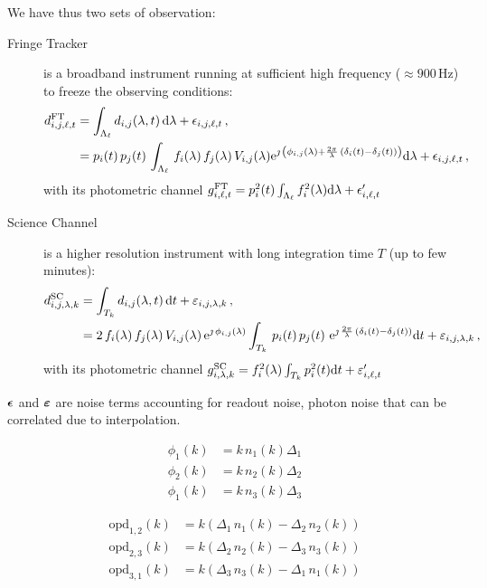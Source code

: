 \documentclass[a4paper,11pt,twoside]{scrartcl}
\newcommand{\FT}{\textrm{FT}} %
\newcommand{\SC}{\textrm{SC}} %
\newcommand{\opd}{\textrm{opd}}
\begin{document}
We have thus two sets of observation:
\begin{description}
	\item[Fringe Tracker] is a broadband instrument running at sufficient high frequency ($\approx 900\,$Hz) to freeze the observing conditions:
	\begin{align}
		d^\FT_{i,j,\ell,t} & =  \int_{\Lambda_\ell} d_{i,j}(\lambda,t)\, \D{\lambda} + \epsilon_{i,j,\ell,t}\,,\\
		& =  p_{i}(t)\,p_{j}(t)\, \int_{\Lambda_\ell} \,f_{i}(\lambda)\,f_{j}(\lambda) \, V_{i,j}(\lambda) 
			 \E^{\jmath \, \left(\phi_{i,j}(\lambda) + \frac{2\pi}{\lambda}\, (\delta_{i}(t) - \delta_{j}(t))\right)} \D{\lambda} + \epsilon_{i,j,\ell,t}\,,
	\end{align}
	with its photometric channel $ g^\FT_{i,\ell,t} = p_i^2(t)\int_{\Lambda_\ell} f^2_{i}(\lambda) \D{\lambda} + \epsilon'_{i,\ell,t}$
	\item[Science Channel] is a higher resolution instrument with long integration time $T$ (up to few minutes):
	\begin{align}
		d^\SC_{i,j,\lambda,k} & =  \int_{T_k} d_{i,j}(\lambda,t)\, \D{t} + \varepsilon_{i,j,\lambda,k}\,,\\
		& =  2\,f_{i}(\lambda)\,f_{j}(\lambda)\, V_{i,j}(\lambda) \,\E^{\jmath \,\phi_{i,j}(\lambda)}\int_{T_k}  \, p_{i}(t)\,p_{j}(t) \,  \,\E^{\jmath \, \frac{2\pi}{\lambda}\, (\delta_{i}(t) - \delta_{j}(t))} \D{t} + \varepsilon_{i,j,\lambda,k}\,,
	\end{align}
	with its photometric channel  $ g^\SC_{i,\lambda,k} = f^2_{i}(\lambda) \int_{T_k} p^2_{i}(t) \D{t} + \varepsilon'_{i,\ell,t}$  
\end{description}
$\boldsymbol{\epsilon}$ and $\boldsymbol{\varepsilon}$ are noise terms accounting for readout noise, photon noise that can be correlated due to interpolation.


\begin{align}
	\phi_1(k) &= k \,n_1(k) \Delta_1\\
	\phi_2(k) &= k \,n_2(k) \Delta_2\\
	\phi_1(k) &= k \,n_3(k) \Delta_3
\end{align}

\begin{align}
	\opd_{1,2}(k) &= k \left(\Delta_1\, n_1(k) - \Delta_2\, n_2(k) \right)\\
	\opd_{2,3}(k) &= k \left(\Delta_2\, n_2(k) - \Delta_3\, n_3(k) \right)\\
	\opd_{3,1}(k) &= k \left(\Delta_3\, n_3(k) - \Delta_1\, n_1(k) \right)
\end{align}
\end{document}

